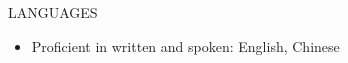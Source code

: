 \documentclass[]{resume}
\begin{document}
	\begin{cvsection}{LANGUAGES}
		\begin{cvsubsection}{}{}{}	
			\begin{itemize}
				\item Proficient in written and spoken: English, Chinese 
			\end{itemize}
		\end{cvsubsection}
	\end{cvsection}
	
\end{document}
